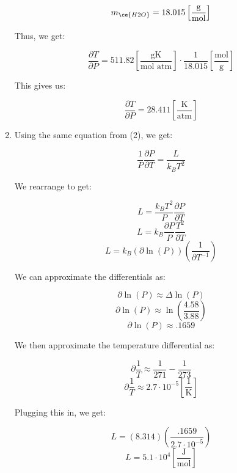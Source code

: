 \begin{enumerate}
    $$m_{\ce{H2O}}=18.015\left[ \frac{\si{\gram}}{\text{mol}} \right]$$

    Thus, we get:

    $$\frac{\partial T}{\partial P}=511.82\left[ \frac{\si{\gram\kelvin}}{\text{mol atm}} \right]\cdot\frac{1}{18.015}\left[ \frac{\text{mol}}{\si{\gram}} \right]$$

    This gives us:

    $$\boxed{\frac{\partial T}{\partial P}=28.411\left[ \frac{\si{\kelvin}}{\text{atm}} \right]}$$

  \item

    Using the same equation from (2), we get:

    $$\frac{1}{P}\frac{\partial P}{\partial T}=\frac{L}{k_B T^2}$$

    We rearrange to get:

    $$L=\frac{k_BT^2}{P}\frac{\partial P}{\partial T}$$
    $$L=k_B\frac{\partial P}{P}\frac{T^2}{\partial T}$$
    $$L=k_B(\partial \ln(P))\left(\frac{1}{\partial T^{-1}}\right)$$

    We can approximate the differentials as:

    $$\partial\ln(P)\approx \Delta \ln(P)$$
    $$\partial\ln(P)\approx \ln\left( \frac{4.58}{3.88} \right)$$
    $$\partial\ln(P)\approx .1659$$

    We then approximate the temperature differential as:

    $$\partial \frac{1}{T}\approx\frac{1}{271}-\frac{1}{273}$$
    $$\partial \frac{1}{T}\approx 2.7\cdot10^{-5}\left[ \frac{1}{\si{\kelvin}} \right]$$

    Plugging this in, we get:

    $$L=(8.314)\left( \frac{.1659}{2.7\cdot10^{-5}} \right)$$
    $$\boxed{L=5.1\cdot10^4\left[ \frac{\si{\joule}}{\si{\mole}} \right]}$$

\end{enumerate}




